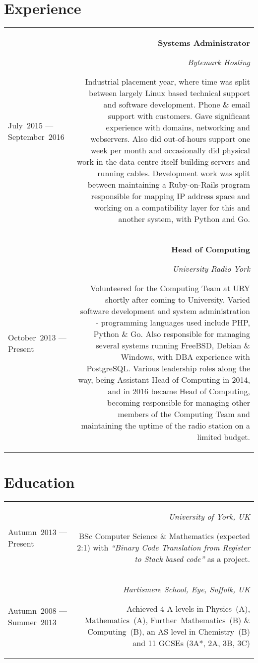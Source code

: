 \documentclass[11pt,a4paper]{article}
\begin{document}
\section{Experience}
\begin{tabularx}{\textwidth}{@{}L R@{}}
  July~2015 --- September~2016 &
  \textbf{Systems Administrator} \par
  \textit{Bytemark Hosting} \par
  Industrial placement year, where time was split between largely Linux based
  technical support and software development. Phone \& email support with
  customers. Gave significant experience with domains, networking and
  webservers. Also did out-of-hours support one week per month and occasionally
  did physical work in the data centre itself building servers and running
  cables. Development work was split between maintaining a Ruby-on-Rails program
  responsible for mapping IP address space and working on a compatibility layer
  for this and another system, with Python and Go.

  \tabularnewline%

  October~2013 --- Present &
  \textbf{Head of Computing} \par
  \textit{University Radio York} \par
  Volunteered for the Computing Team at URY shortly after coming to University.
  Varied software development and system administration - programming languages
  used include PHP, Python \& Go. Also responsible for managing several systems
  running FreeBSD, Debian \& Windows, with DBA experience with PostgreSQL.
  Various leadership roles along the way, being Assistant Head of Computing in
  2014, and in 2016 became Head of Computing, becoming responsible for managing
  other members of the Computing Team and maintaining the uptime of the radio
  station on a limited budget.
\end{tabularx}

\section{Education}
\begin{tabularx}{\textwidth}{@{}L R@{}}
  Autumn~2013 --- Present &
  \textit{University of York, UK} \par
  BSc Computer Science \& Mathematics (expected 2:1) with \textit{``Binary Code
  Translation from Register to Stack based code''} as a project.

  \tabularnewline%

  Autumn~2008 --- Summer~2013 &
  \textit{Hartismere School, Eye, Suffolk, UK} \par
  Achieved 4 A-levels in Physics~(A), Mathematics~(A), Further~Mathematics~(B)
  \& Computing~(B), an AS level in Chemistry~(B) and 11 GCSEs (3A*, 2A, 3B, 3C)
\end{tabularx}
\end{document}
